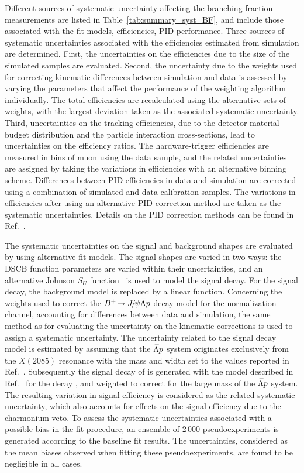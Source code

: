 Different sources of systematic uncertainty affecting the branching fraction measurements are listed in Table~\ref{tab:summary_syst_BF}, and include those associated with the fit models, efficiencies, PID performance.
Three sources of systematic uncertainties associated with the efficiencies estimated from simulation are determined. First, the uncertainties on the  efficiencies due to the size of the simulated samples are evaluated. Second, the uncertainty due to the weights used for correcting kinematic differences between simulation and data is assessed by
varying the parameters that affect the performance of the weighting algorithm  individually.
The total efficiencies are recalculated using the alternative sets
of weights, with the largest deviation taken as the associated systematic uncertainty.
Third, uncertainties on the tracking efficiencies, due to the detector material budget distribution and the particle interaction cross-sections, lead to uncertainties on the efficiency ratios.
The hardware-trigger efficiencies are measured in bins of muon \pt using the \decay{\Bp}{\jpsi \Kp} data sample, and the related uncertainties are assigned by taking the variations in efficiencies with an alternative binning scheme.
Differences between PID efficiencies in data and simulation are corrected using a combination of simulated and data calibration samples. The variations in efficiencies after using an alternative PID correction method are taken as the systematic uncertainties. Details on the PID correction methods can be found in Ref.~\cite{LHCb-PAPER-2022-004}.

The systematic uncertainties on the signal and background shapes are evaluated by using alternative fit models. The signal shapes are varied in two ways: the DSCB function parameters are varied within their uncertainties, and an alternative Johnson $S_U$ function~\cite{JohnsonSU} is used to model the signal decay. For the signal decay, the background model is replaced by a linear function. Concerning the weights used to correct the $\mbox{\ensuremath{B^{+}\!\rightarrow {\ensuremath{{J\mskip -3mu/\mskip -2mu\psi}}} {\ensuremath{\kern 0.18em\overline{\kern -0.18em \Lambda}}} p}}$ decay model for the normalization channel, accounting for differences between data and simulation,
the same method as for evaluating the uncertainty on the kinematic corrections is used to assign a systematic uncertainty.
The uncertainty related to the signal decay model is estimated by assuming that the ${\kern 0.18em\overline{\kern -0.18em \Lambda}} p$ system originates exclusively from the $X(2085)$ resonance with the mass and width set to the  values reported in Ref.~\cite{BESIII:2023kgz}. Subsequently the signal decay of  is generated with the model described in Ref.~\cite{Hatanaka:2008gu}  for the decay , and weighted to correct for the large mass of the ${\kern 0.18em\overline{\kern -0.18em \Lambda}} p$ system. The resulting variation in signal efficiency is considered as the related systematic uncertainty, which also accounts for effects on the signal efficiency due to
the charmonium veto.
To assess the systematic uncertainties associated with a possible bias in the fit procedure, an ensemble of
2\,000 pseudoexperiments is generated according to the baseline fit results.
The uncertainties, considered as the mean biases observed when fitting these pseudoexperiments, are found to be negligible in all cases.

